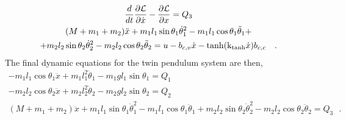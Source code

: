 \begin{gather}
\frac{d}{dt}  \frac{\partial \cal{L}}{\partial \dot{x}} - \frac{\partial \cal{L}}{\partial x}  = Q_3 \\
(M + m_1 + m_2) \ddot{x} + m_1 l_1 \sin \theta_1 \dot{\theta}_1^2 - m_1 l_1 \cos \theta_1 \ddot{\theta}_1 + \nonumber \\
+ m_2 l_2 \sin \theta_2 \dot{\theta}_2^2 - m_2 l_2 \cos \theta_2 \ddot{\theta}_2 = u - b_{c,v} \dot{x} - \tanh(\text{k}_\text{tanh}\dot{x}) b_{c,c}  \ \ \ .
\label{eq:xDynamics}
\end{gather}
%
The final dynamic equations for the twin pendulum system are then,
%
\begingroup\makeatletter\def\f@size{10}\check@mathfonts
\def\maketag@@@#1{\hbox{\m@th\normalsize\normalfont#1}}%
\begin{gather}
- m_1 l_1 \cos \theta_1 \ddot{x} + m_1 l_1^2 \ddot{\theta}_1 - m_1 g l_1 \sin \theta_1 = Q_1 
\label{eq:theta1Dynamics1} \\
- m_2 l_2 \cos \theta_2 \ddot{x} + m_2 l_2^2 \ddot{\theta}_2 - m_2 g l_2 \sin \theta_2 = Q_2
\label{eq:theta2Dynamics1} \\
(M + m_1 + m_2) \ddot{x} + m_1 l_1 \sin \theta_1 \dot{\theta}_1^2 - m_1 l_1 \cos \theta_1 \ddot{\theta}_1 + m_2 l_2 \sin \theta_2 \dot{\theta}_2^2 - m_2 l_2 \cos \theta_2 \ddot{\theta}_2 = Q_3  \ \ \ . 
\label{eq:xDynamics1} \\ \nonumber
\end{gather}\endgroup \vspace{-44pt}

